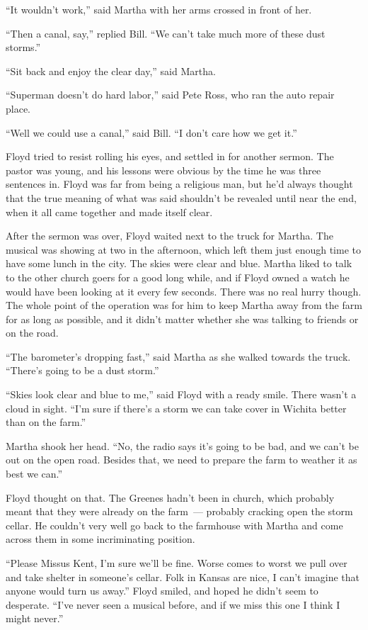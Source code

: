 \documentclass[ebook,12pt]{memoir}
\begin{document}
``It wouldn't work,'' said Martha with her arms crossed in front of her.

``Then a canal, say,'' replied Bill. ``We can't take much more of these
dust storms.''

``Sit back and enjoy the clear day,'' said Martha.

``Superman doesn't do hard labor,'' said Pete Ross, who ran the auto
repair place.

``Well we could use a canal,'' said Bill. ``I don't care how we get
it.''

Floyd tried to resist rolling his eyes, and settled in for another
sermon. The pastor was young, and his lessons were obvious by the time
he was three sentences in. Floyd was far from being a religious man, but
he'd always thought that the true meaning of what was said shouldn't be
revealed until near the end, when it all came together and made itself
clear.

After the sermon was over, Floyd waited next to the truck for Martha.
The musical was showing at two in the afternoon, which left them just
enough time to have some lunch in the city. The skies were clear and
blue. Martha liked to talk to the other church goers for a good long
while, and if Floyd owned a watch he would have been looking at it every
few seconds. There was no real hurry though. The whole point of the
operation was for him to keep Martha away from the farm for as long as
possible, and it didn't matter whether she was talking to friends or on
the road.

``The barometer's dropping fast,'' said Martha as she walked towards the
truck. ``There's going to be a dust storm.''

``Skies look clear and blue to me,'' said Floyd with a ready smile.
There wasn't a cloud in sight. ``I'm sure if there's a storm we can take
cover in Wichita better than on the farm.''

Martha shook her head. ``No, the radio says it's going to be bad, and we
can't be out on the open road. Besides that, we need to prepare the farm
to weather it as best we can.''

Floyd thought on that. The Greenes hadn't been in church, which probably
meant that they were already on the farm~--- probably cracking open the
storm cellar. He couldn't very well go back to the farmhouse with Martha
and come across them in some incriminating position.

``Please Missus Kent, I'm sure we'll be fine. Worse comes to worst we
pull over and take shelter in someone's cellar. Folk in Kansas are nice,
I can't imagine that anyone would turn us away.'' Floyd smiled, and
hoped he didn't seem to desperate. ``I've never seen a musical before,
and if we miss this one I think I might never.''
\end{document}
